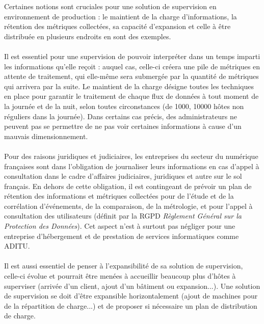 Certaines notions sont cruciales pour une solution de supervision en environnement de production : le maintient de la charge d'informations, la rétention des métriques collectées, sa capacité d'expansion et celle à être distribuée en plusieurs endroits en sont des exemples.
\\ \\
Il est essentiel pour une supervision de pouvoir interpréter dans un temps imparti les informations qu'elle reçoit : auquel cas, celle-ci créera une pile de métriques en attente de traitement, qui elle-même sera submergée par la quantité de métriques qui arrivera par la suite. Le maintient de la charge désigne toutes les techniques en place pour garantir le traitement de chaque flux de données à tout moment de la journée et de la nuit, selon toutes circonstances (de 1000, 10000 hôtes non réguliers dans la journée). Dans certains cas précis, des administrateurs ne peuvent pas se permettre de ne pas voir certaines informations à cause d'un mauvais dimensionnement.
\\ \\
Pour des raisons juridiques et judiciaires, les entreprises du secteur du numérique françaises sont dans l'obligation de journaliser leurs informations en cas d'appel à consultation dans le cadre d'affaires judiciaires, juridiques et autre sur le sol français. En dehors de cette obligation, il est contingeant de prévoir un plan de rétention des informations et métriques collectées pour de l'étude et de la corrélation d'événements, de la comparaison, de la métrologie, et pour l'appel à consultation des utilisateurs (définit par la RGPD \textit{Règlement Général sur la Protection des Données}). Cet aspect n'est à surtout pas négliger pour une entreprise d'hébergement et de prestation de services informatiques comme ADITU.
\\ \\
Il est aussi essentiel de penser à l'expansibilité de sa solution de supervision, celle-ci évolue et pourrait être menées à accueillir beaucoup plus d'hôtes à superviser (arrivée d'un client, ajout d'un bâtiment ou expansion...). Une solution de supervision se doit d'être expansible horizontalement (ajout de machines pour de la répartition de charge...) et de proposer si nécessaire un plan de distribution de charge.
\\ \\
